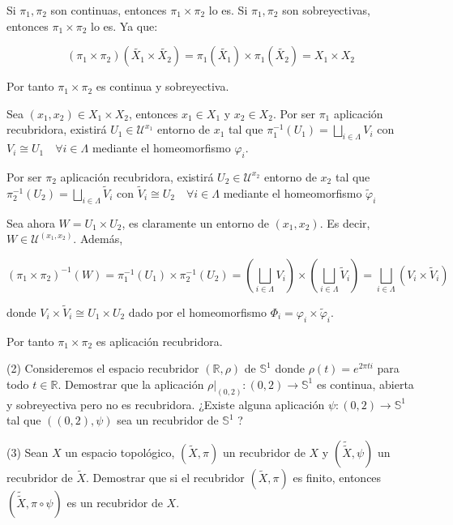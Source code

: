 \documentclass[
  a4paper,
  spanish,
  12pt,
]{scrartcl}
\begin{document}
\begin{sol}
Si $\pi_1, \pi_2$ son continuas, entonces $\pi_1 \times \pi_2$ lo es.
Si $\pi_1, \pi_2$ son sobreyectivas, entonces $\pi_1 \times \pi_2$ lo es. Ya que:

$$
(\pi_1 \times \pi_2)(\tilde{X_1} \times \tilde{X_2}) = \pi_1(\tilde{X_1}) \times \pi_1(\tilde{X_2}) = X_1 \times X_2
$$

Por tanto $\pi_1 \times \pi_2$ es continua y sobreyectiva.

Sea $(x_1, x_2) \in X_1 \times X_2$, entonces $x_1 \in X_1$ y $x_2 \in X_2$.
Por ser $\pi_1$ aplicación recubridora, existirá $U_1 \in \mathcal{U}^{x_1}$ entorno de $x_1$ tal que
$\pi_1^{-1}(U_1) = \bigsqcup_{i \in \Lambda} V_i$ con $V_i \cong U_1 \quad \forall i \in \Lambda$ mediante
el homeomorfismo $\varphi_i$.

Por ser $\pi_2$ aplicación recubridora, existirá $U_2 \in \mathcal{U}^{x_2}$ entorno de $x_2$ tal que
$\pi_2^{-1}(U_2) = \bigsqcup_{i \in \Lambda} \tilde{V}_i$ con $\tilde{V}_i \cong U_2 \quad \forall i \in \Lambda$ mediante
el homeomorfismo $\tilde{\varphi}_i$

Sea ahora $W = U_1 \times U_2$, es claramente un entorno de $(x_1, x_2)$. Es decir, $W \in \mathcal{U}^{(x_1, x_2)}$.
Además,

$$
(\pi_1 \times \pi_2)^{-1}(W) = \pi_1^{-1}(U_1) \times \pi_2^{-1}(U_2) = 
\left(\bigsqcup_{i \in \Lambda} V_i \right)  \times \left(\bigsqcup_{i \in \Lambda} \tilde{V}_i \right) 
= \bigsqcup_{i \in \Lambda} (V_i \times \tilde{V}_i )
$$

donde $V_i \times \tilde{V}_i \cong U_1 \times U_2$ dado por el homeomorfismo $\Phi_i = \varphi_i \times \tilde{\varphi}_i$.

Por tanto $\pi_1 \times \pi_2$ es aplicación recubridora.
\end{sol}

\begin{ejer}
(2) Consideremos el espacio recubridor $(\mathbb{R}, \rho)$ de $\mathbb{S}^{1}$ donde $\rho(t)=e^{2 \pi t i}$ para todo $t \in \mathbb{R}$. Demostrar que la aplicación $\left.\rho\right|_{(0,2)}:(0,2) \rightarrow \mathbb{S}^{1}$ es continua, abierta y sobreyectiva pero no es recubridora. ¿Existe alguna aplicación $\psi:(0,2) \rightarrow \mathbb{S}^{1}$ tal que $((0,2), \psi)$ sea un recubridor de $\mathbb{S}^{1}$ ?\\
\end{ejer}

\begin{ejer}
(3) Sean $X$ un espacio topológico, $(\widetilde{X}, \pi)$ un recubridor de $X$ y $(\widetilde{\widetilde{X}}, \psi)$ un recubridor de $\widetilde{X}$. Demostrar que si el recubridor $(\widetilde{X}, \pi)$ es finito, entonces $(\widetilde{\widetilde{X}}, \pi \circ \psi)$ es un recubridor de $X$.\\
\end{ejer}
\end{document}

